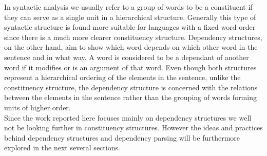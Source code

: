 \documentclass[bsc,frontabs,twoside,singlespacing,parskip,deptrepor]{infthesis}
\begin{document}
In syntactic analysis we usually refer to a group of words to be a constituent if they can serve as a single unit in a hierarchical structure. Generally this type of syntactic structure is found more suitable for languages with a fixed word order since there is a much more clearer constituency structure. Dependency structures, on the other hand, aim to show which word depends on which other word in the sentence and in what way. A word is considered to be a dependant of another word if it modifies or is an argument of that word. Even though both structures represent a hierarchical ordering of the elements in the sentence, unlike the constituency structure, the dependency structure is concerned with the relations between the elements in the sentence rather than the grouping of words forming units of higher order.\cite{P2}
\\Since the work reported here focuses mainly on dependency structures we well not be looking further in constituency structures. However the ideas and practices behind dependency structures and dependency parsing will be furthermore explored in the next several sections.
\end{document}
